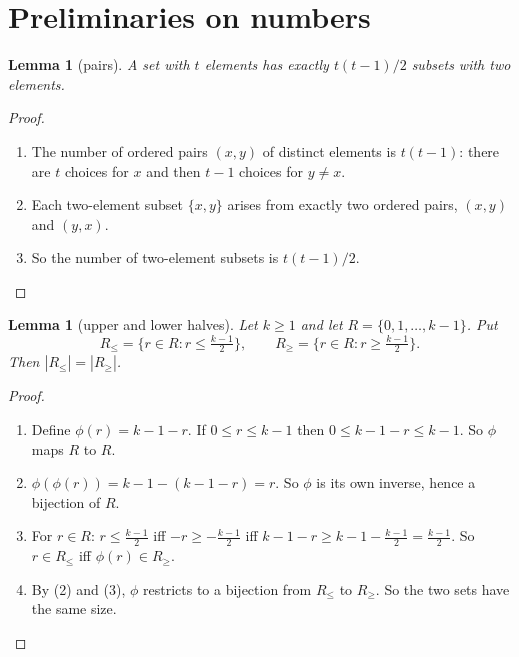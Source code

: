 \documentclass[11pt]{article}
\theoremstyle{plain}
\newtheorem{lemma}[theorem]{Lemma}
\theoremstyle{definition}
\theoremstyle{remark}
\newcommand{\half}{\tfrac{k-1}{2}}
\newenvironment{steps}{\begin{enumerate}[label=(\arabic*),leftmargin=2.2em,itemsep=0.35em]}{\end{enumerate}}
\begin{document}
\section{Preliminaries on numbers}\label{sec:numbers}

\begin{lemma}[pairs]\label{lem:pairs}
A set with $t$ elements has exactly $t(t-1)/2$ subsets with two elements.
\end{lemma}

\begin{proof}
\begin{steps}
  \item The number of ordered pairs $(x,y)$ of distinct elements is $t(t-1)$: there are $t$
    choices for $x$ and then $t-1$ choices for $y\ne x$.
  \item Each two-element subset $\{x,y\}$ arises from exactly two ordered pairs, $(x,y)$ and
    $(y,x)$.
  \item So the number of two-element subsets is $t(t-1)/2$. \qedhere
\end{steps}
\end{proof}

\begin{lemma}[upper and lower halves]\label{lem:halves}
Let $k\ge 1$ and let $R=\{0,1,\dots,k-1\}$. Put
\[
  R_{\le}=\{r\in R : r\le \half\},\qquad R_{\ge}=\{r\in R : r\ge \half\}.
\]
Then $|R_{\le}|=|R_{\ge}|$.
\end{lemma}

\begin{proof}
\begin{steps}
  \item Define $\phi(r)=k-1-r$. If $0\le r\le k-1$ then $0\le k-1-r\le k-1$. So $\phi$ maps $R$
    to $R$.
  \item $\phi(\phi(r))=k-1-(k-1-r)=r$. So $\phi$ is its own inverse, hence a bijection of $R$.
  \item For $r\in R$: $r\le\half$ iff $-r\ge-\half$ iff $k-1-r\ge k-1-\half=\half$. So
    $r\in R_{\le}$ iff $\phi(r)\in R_{\ge}$.
  \item By (2) and (3), $\phi$ restricts to a bijection from $R_{\le}$ to $R_{\ge}$. So the two
    sets have the same size. \qedhere
\end{steps}
\end{proof}
\end{document}
